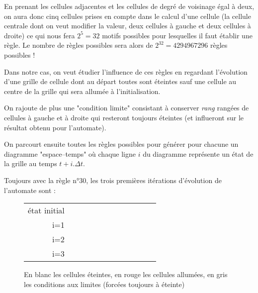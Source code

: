 \documentclass[11pt]{article}
\begin{document}
En prenant les cellules adjacentes et les cellules de degré de voisinage égal à deux, on aura donc cinq cellules prises en compte dans le calcul d'une
cellule (la cellule centrale dont on veut modifier la valeur, deux cellules à gauche et deux cellules à droite) ce qui nous fera $2^{5} = 32$ motifs 
possibles pour lesquelles il faut établir une règle. Le nombre de règles possibles sera alors de $2^{32} =  4294 967 296$ règles possibles !

Dans notre cas, on veut étudier l'influence de ces règles en regardant l'évolution d'une grille de cellule dont au départ toutes sont éteintes sauf une cellule
au centre de la grille qui sera allumée à l'initialisation.

On rajoute de plus une "condition limite" consistant à conserver \textsl{rang} rangées de cellules à gauche et à droite qui resteront toujours éteintes (et influeront sur 
le résultat obtenu pour l'automate).

On parcourt ensuite toutes les règles possibles pour générer pour chacune un diagramme "espace--temps" où chaque ligne $i$ du diagramme représente un état 
de la grille au temps $t + i.\Delta t$.

Toujours avec la règle n°30, les trois premières  itérations d'évolution de l'automate sont :\\
\begin{figure}[ht]
\begin{center}
\begin{tabular}{r|c|c|c|c|c|c|c|c|c|c|c|}\cline{2-12}
état initial & \cellcolor{black!25}\phantom{A} & \phantom{A} & \phantom{A} & \phantom{A} & \phantom{A} & \cellcolor{red}\phantom{A} & 
\phantom{A} & \phantom{A} & \phantom{A} & \phantom{A} & \cellcolor{black!25}\phantom{A} \\ \cline{2-12}
i=1 & \cellcolor{black!25}\phantom{A} & \phantom{A} & \phantom{A} & \phantom{A} & \cellcolor{red}\phantom{A} & \cellcolor{red}\phantom{A} & 
\cellcolor{red}\phantom{A} & \phantom{A} & \phantom{A} & \phantom{A} & \cellcolor{black!25}\phantom{A} \\ \cline{2-12}
i=2 & \cellcolor{black!25}\phantom{A} & \phantom{A} & \phantom{A} & \cellcolor{red}\phantom{A} & \cellcolor{red}\phantom{A} & \phantom{A} & 
\phantom{A} & \cellcolor{red}\phantom{A} & \phantom{A} & \phantom{A} & \cellcolor{black!25}\phantom{A} \\ \cline{2-12}
i=3 & \cellcolor{black!25}\phantom{A} & \phantom{A} & \cellcolor{red}\phantom{A} & \cellcolor{red}\phantom{A} & \phantom{A} & \cellcolor{red}\phantom{A} & 
\cellcolor{red}\phantom{A} & \cellcolor{red}\phantom{A} & \cellcolor{red}\phantom{A} & \phantom{A} & \cellcolor{black!25}\phantom{A} \\ \cline{2-12}\end{tabular}
\end{center}
\caption{En blanc les cellules éteintes, en rouge les cellules allumées, en gris les conditions aux limites (forcées toujours à éteinte)}
\end{figure}
\end{document}
